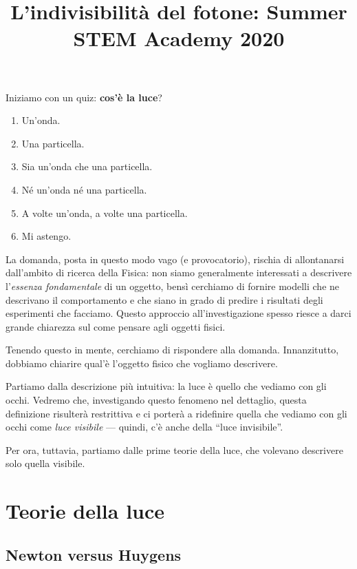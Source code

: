 \documentclass{article}
\title{L'indivisibilità del fotone: Summer STEM Academy 2020}
\begin{document}
\maketitle

\tableofcontents

\medskip

Iniziamo con un quiz: \textbf{cos'è la luce}?

\begin{enumerate}[label=\emph{\alph*})]
    \item Un'onda.
    \item Una particella.
    \item Sia un'onda che una particella. 
    \item Né un'onda né una particella. 
    \item A volte un'onda, a volte una particella.
    \item Mi astengo.
\end{enumerate}

La domanda, posta in questo modo vago (e provocatorio), rischia di allontanarsi dall'ambito di ricerca della Fisica: non siamo generalmente interessati a descrivere l'\emph{essenza fondamentale} di un oggetto, bensì cerchiamo di fornire modelli che ne descrivano il comportamento e che siano in grado di predire i risultati degli esperimenti che facciamo. 
Questo approccio all'investigazione spesso riesce a darci grande chiarezza sul come pensare agli oggetti fisici. 


Tenendo questo in mente, cerchiamo di rispondere alla domanda.
Innanzitutto, dobbiamo chiarire qual'è l'oggetto fisico che vogliamo descrivere.

Partiamo dalla descrizione più intuitiva: la luce è quello che vediamo con gli occhi. 
Vedremo che, investigando questo fenomeno nel dettaglio, questa definizione risulterà restrittiva e ci porterà a ridefinire quella che vediamo con gli occhi come \emph{luce visibile} --- quindi, c'è anche della ``luce invisibile''.

Per ora, tuttavia, partiamo dalle prime teorie della luce, che volevano descrivere solo quella visibile.

\section{Teorie della luce}

\subsection{Newton versus Huygens} \label{sec:newton-vs-huygens}
\end{document}

